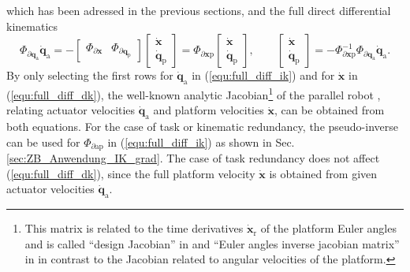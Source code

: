\documentclass[robotics,article,submit,moreauthors,pdftex]{Definitions/mdpi}
\newcommand{\bm}[1]{\boldsymbol{#1}}
\let\Phi\varPhi
\begin{document}
%
which has been adressed in the previous sections, and the full direct differential kinematics
%
\begin{equation}
\bm{\Phi}_{\partial\bm{q}_{\mathrm{a}}} \dot{\bm{q}}_{\mathrm{a}} 
=
- 
\begin{bmatrix} \bm{\Phi}_{\partial\bm{x}} & \bm{\Phi}_{\partial\bm{q}_{\mathrm{p}}} \end{bmatrix}
\begin{bmatrix}
\dot{\bm{x}} \\
\dot{\bm{q}}_{\mathrm{p}}
\end{bmatrix}
=
\bm{\Phi}_{\partial\bm{x}\mathrm{p}}
\begin{bmatrix}
\dot{\bm{x}} \\
\dot{\bm{q}}_{\mathrm{p}}
\end{bmatrix},
\quad\quad
\begin{bmatrix}
\dot{\bm{x}} \\
\dot{\bm{q}}_{\mathrm{p}}
\end{bmatrix}
=
-\bm{\Phi}_{\partial\bm{x}\mathrm{p}}^{-1} \bm{\Phi}_{\partial\bm{q}_{\mathrm{a}}}
\dot{\bm{q}}_{\mathrm{a}}.
\label{equ:full_diff_dk}
\end{equation}
%
By only selecting the first rows for $\dot{\bm{q}}_{\mathrm{a}}$ in (\ref{equ:full_diff_ik}) and for $\dot{\bm{x}}$ in (\ref{equ:full_diff_dk}), the well-known analytic Jacobian\footnote{This matrix is related to the time derivatives $\dot{\bm{x}}_{\mathrm{r}}$ of the platform Euler angles and is called ``design Jacobian'' in \cite{Gogu2008} and ``Euler
angles inverse jacobian matrix'' in \cite{Merlet2006} in contrast to the Jacobian related to angular velocities of the platform.} of the parallel robot \cite{Merlet2006,Gogu2008}, relating actuator velocities $\dot{\bm{q}}_{\mathrm{a}}$ and platform velocities $\dot{\bm{x}}$, can be obtained from both equations.
For the case of task or kinematic redundancy, the pseudo-inverse can be used for $\bm{\Phi}_{\partial\mathrm{ap}}$ in (\ref{equ:full_diff_ik}) as shown in Sec.\,\ref{sec:ZB_Anwendung_IK_grad}.
The case of task redundancy does not affect (\ref{equ:full_diff_dk}), since the full platform velocity $\dot{\bm{x}}$ is obtained from given actuator velocities $\dot{\bm{q}}_{\mathrm{a}}$.

\end{document}
